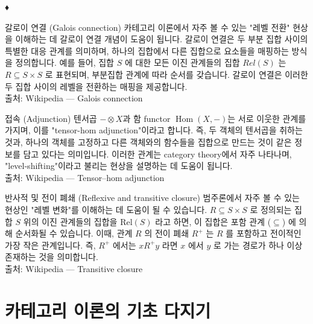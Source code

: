 \documentclass[11pt, a4paper, twoside, openany]{book}
\begin{document}
\par\medskip
♦

\begin{deepresearch}{갈로이 연결 (Galois connection)}
카테고리 이론에서 자주 볼 수 있는 "레벨 전환" 현상을 이해하는 데 갈로이 연결 개념이 도움이 됩니다.  갈로이 연결은 두 부분 집합 사이의 특별한 대응 관계를 의미하며, 하나의 집합에서 다른 집합으로 요소들을 매핑하는 방식을 정의합니다. 예를 들어, 집합 $S$ 에 대한 모든 이진 관계들의 집합 $Rel(S)$ 는 $R \subseteq S \times S$ 로 표현되며, 부분집합 관계에 따라 순서를 갖습니다. 갈로이 연결은 이러한 두 집합 사이의 레벨을 전환하는 매핑을 제공합니다.
\\[4pt]{\footnotesize\color{ctgray} 출처: Wikipedia — Galois connection}
\end{deepresearch}

\begin{deepresearch}{접속 (Adjunction)}
텐서곱 $− \otimes X$과 함 functor $\operatorname{Hom}(X,-)$는 서로 이웃한 관계를 가지며, 이를 "tensor-hom adjunction"이라고 합니다.  즉, 두 객체의 텐서곱을 취하는 것과, 하나의 객체를 고정하고 다른 객체와의 함수들을 집합으로 만드는 것이 같은 정보를 담고 있다는 의미입니다. 이러한 관계는 category theory\hspace{0pt}에서 자주 나타나며, "level-shifting"이라고 불리는 현상을 설명하는 데 도움이 됩니다.
\\[4pt]{\footnotesize\color{ctgray} 출처: Wikipedia — Tensor–hom adjunction}
\end{deepresearch}

\begin{deepresearch}{반사적 및 전이 폐쇄 (Reflexive and transitive closure)}
범주론에서 자주 볼 수 있는 현상인 "레벨 변화"를 이해하는 데 도움이 될 수 있습니다.  $R \subseteq S \times S$ 로 정의되는 집합 $S$ 위의 이진 관계들의 집합을 $\text{Rel}(S)$ 라고 하면, 이 집합은 포함 관계 ($\subseteq$) 에 의해 순서화될 수 있습니다.  이때, 관계 $R$ 의 전이 폐쇄 $R^+$ 는 $R$ 를 포함하고 전이적인 가장 작은 관계입니다.  즉, $R^+$ 에서는 $x R^+ y$ 라면 $x$ 에서 $y$ 로 가는 경로가 하나 이상 존재하는 것을 의미합니다.
\\[4pt]{\footnotesize\color{ctgray} 출처: Wikipedia — Transitive closure}
\end{deepresearch}


\section{카테고리 이론의 기초 다지기}
\label{sec:1-5}

$$ $$
\end{document}
